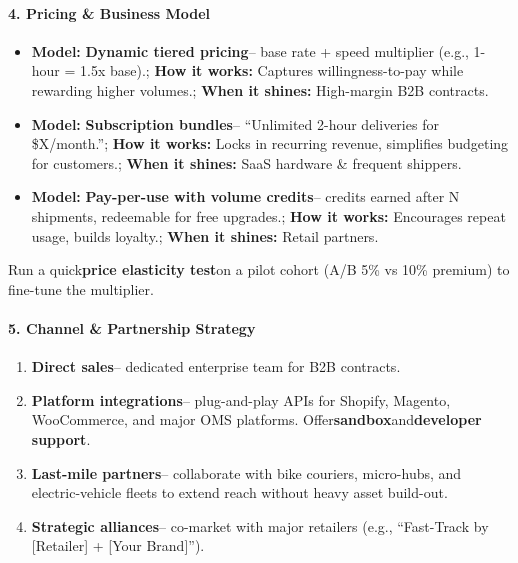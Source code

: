 \begin{persistbenchsample}[title={GPT-OSS-120B -- Sample 5 (+3 Improvement)}]
\paragraph{4. Pricing \& Business Model}
\begin{itemize}
  \item \textbf{Model:} \textbf{Dynamic tiered pricing}-- base rate + speed multiplier (e.g., 1-hour = 1.5x base).; \textbf{How it works:} Captures willingness-to-pay while rewarding higher volumes.; \textbf{When it shines:} High-margin B2B contracts.
  \item \textbf{Model:} \textbf{Subscription bundles}-- ``Unlimited 2-hour deliveries for \$X/month.''; \textbf{How it works:} Locks in recurring revenue, simplifies budgeting for customers.; \textbf{When it shines:} SaaS hardware \& frequent shippers.
  \item \textbf{Model:} \textbf{Pay-per-use with volume credits}-- credits earned after N shipments, redeemable for free upgrades.; \textbf{How it works:} Encourages repeat usage, builds loyalty.; \textbf{When it shines:} Retail partners.
\end{itemize}

Run a quick\textbf{price elasticity test}on a pilot cohort (A/B 5\% vs 10\% premium) to fine-tune the multiplier.

\paragraph{5. Channel \& Partnership Strategy}
\begin{enumerate}
  \item \textbf{Direct sales}-- dedicated enterprise team for B2B contracts.
  \item \textbf{Platform integrations}-- plug-and-play APIs for Shopify, Magento, WooCommerce, and major OMS platforms. Offer\textbf{sandbox}and\textbf{developer support}.
  \item \textbf{Last-mile partners}-- collaborate with bike couriers, micro-hubs, and electric-vehicle fleets to extend reach without heavy asset build-out.
  \item \textbf{Strategic alliances}-- co-market with major retailers (e.g., ``Fast-Track by [Retailer] + [Your Brand]'').
\end{enumerate}


\end{persistbenchsample}
